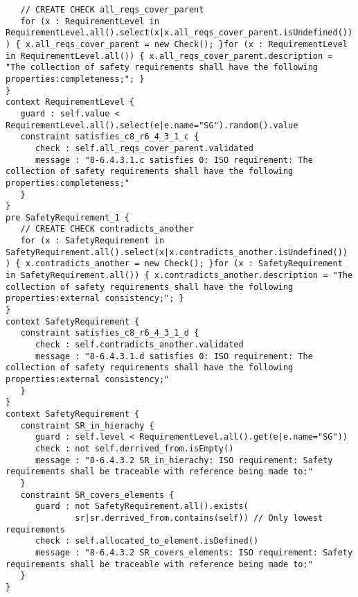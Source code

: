 \documentclass[a4paper]{article}
\begin{document}
\begin{lstlisting}
   // CREATE CHECK all_reqs_cover_parent
   for (x : RequirementLevel in RequirementLevel.all().select(x|x.all_reqs_cover_parent.isUndefined()) ) { x.all_reqs_cover_parent = new Check(); }for (x : RequirementLevel in RequirementLevel.all()) { x.all_reqs_cover_parent.description = "The collection of safety requirements shall have the following properties:completeness;"; }
}
context RequirementLevel {
   guard : self.value < RequirementLevel.all().select(e|e.name="SG").random().value
   constraint satisfies_c8_r6_4_3_1_c {
      check : self.all_reqs_cover_parent.validated
      message : "8-6.4.3.1.c satisfies 0: ISO requirement: The collection of safety requirements shall have the following properties:completeness;"
   }
}
pre SafetyRequirement_1 {
   // CREATE CHECK contradicts_another
   for (x : SafetyRequirement in SafetyRequirement.all().select(x|x.contradicts_another.isUndefined()) ) { x.contradicts_another = new Check(); }for (x : SafetyRequirement in SafetyRequirement.all()) { x.contradicts_another.description = "The collection of safety requirements shall have the following properties:external consistency;"; }
}
context SafetyRequirement {
   constraint satisfies_c8_r6_4_3_1_d {
      check : self.contradicts_another.validated
      message : "8-6.4.3.1.d satisfies 0: ISO requirement: The collection of safety requirements shall have the following properties:external consistency;"
   }
}
context SafetyRequirement {
   constraint SR_in_hierachy {
      guard : self.level < RequirementLevel.all().get(e|e.name="SG"))
      check : not self.derrived_from.isEmpty()
      message : "8-6.4.3.2 SR_in_hierachy: ISO requirement: Safety requirements shall be traceable with reference being made to:"
   }
   constraint SR_covers_elements {
      guard : not SafetyRequirement.all().exists(
              sr|sr.derrived_from.contains(self)) // Only lowest requirements
      check : self.allocated_to_element.isDefined()
      message : "8-6.4.3.2 SR_covers_elements: ISO requirement: Safety requirements shall be traceable with reference being made to:"
   }
}
\end{lstlisting}
\end{document}

